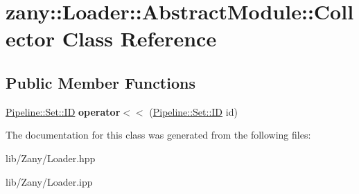 \hypertarget{classzany_1_1_loader_1_1_abstract_module_1_1_collector}{}\section{zany\+:\+:Loader\+:\+:Abstract\+Module\+:\+:Collector Class Reference}
\label{classzany_1_1_loader_1_1_abstract_module_1_1_collector}
\subsection*{Public Member Functions}
\begin{DoxyCompactItemize}
\item 
\mbox{\label{classzany_1_1_loader_1_1_abstract_module_1_1_collector_ac3f33806a77c3485229a0167d53c64d0}} 
\hyperlink{structzany_1_1_pipeline_1_1_set_1_1_i_d}{Pipeline\+::\+Set\+::\+ID} {\bfseries operator$<$$<$} (\hyperlink{structzany_1_1_pipeline_1_1_set_1_1_i_d}{Pipeline\+::\+Set\+::\+ID} id)
\end{DoxyCompactItemize}


The documentation for this class was generated from the following files\+:\begin{DoxyCompactItemize}
\item 
lib/\+Zany/Loader.\+hpp\item 
lib/\+Zany/Loader.\+ipp\end{DoxyCompactItemize}
